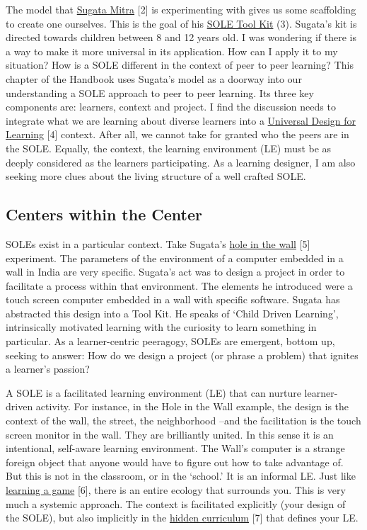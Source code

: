 The model that \href{http://sugatam.wikispaces.com/}{Sugata Mitra}
{{[}2{]}} is experimenting with gives us some scaffolding to create one
ourselves. This is the goal of his
\href{http://www.ted.com/pages/sole_toolkit}{SOLE Tool Kit} (3).
Sugata's kit is directed towards children between 8 and 12 years old. I
was wondering if there is a way to make it more universal in its
application. How can I apply it to my situation? How is a SOLE different
in the context of peer to peer learning? This chapter of the Handbook
uses Sugata's model as a doorway into our understanding a SOLE approach
to peer to peer learning. Its three key components are: learners,
context and project. I find the discussion needs to integrate what we
are learning about diverse learners into a
\href{http://www.udlcenter.org/aboutudl/udlguidelines}{Universal Design
for Learning} {{[}4{]}} context. After all, we cannot take for granted
who the peers are in the SOLE. Equally, the context, the learning
environment (LE) must be as deeply considered as the learners
participating. As a learning designer, I am also seeking more clues
about the living structure of a well crafted SOLE.

\subsection{Centers within the Center}\label{centers-within-the-center}

SOLEs exist in a particular context. Take Sugata's
\href{http://www.ted.com/talks/sugata_mitra_shows_how_kids_teach_themselves.html}{hole
in the wall} {{[}5{]}} experiment. The parameters of the environment of
a computer embedded in a wall in India are very specific. Sugata's act
was to design a project in order to facilitate a process within that
environment. The elements he introduced were a touch screen computer
embedded in a wall with specific software. Sugata has abstracted this
design into a Tool Kit. He speaks of `Child Driven Learning',
intrinsically motivated learning with the curiosity to learn something
in particular. As a learner-centric peeragogy, SOLEs are emergent,
bottom up, seeking to answer: How do we design a project (or phrase a
problem) that ignites a learner's passion?

A SOLE is a facilitated learning environment (LE) that can nurture
learner-driven activity. For instance, in the Hole in the Wall example,
the design is the context of the wall, the street, the neighborhood
--and the facilitation is the touch screen monitor in the wall. They are
brilliantly united. In this sense it is an intentional, self-aware
learning environment. The Wall's computer is a strange foreign object
that anyone would have to figure out how to take advantage of. But this
is not in the classroom, or in the `school.' It is an informal LE. Just
like
\href{http://www.academia.edu/1137269/Game-based_Learning_and_Intrinsic_Motivation}{learning
a game} {{[}6{]}}, there is an entire ecology that surrounds you. This
is very much a systemic approach. The context is facilitated explicitly
(your design of the SOLE), but also implicitly in the
\href{http://en.wikipedia.org/wiki/Hidden_curriculum}{hidden curriculum}
{{[}7{]}} that defines your LE. 

